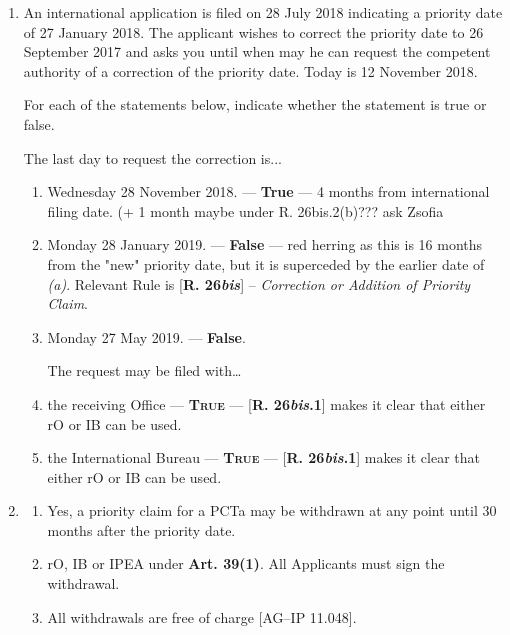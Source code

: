 \documentclass{report}
\begin{document}
\begin{enumerate}[label=\textbf{Answer \arabic*}]
\begin{enumerate}[label=(\alph*)]
    \end{enumerate}
    \item %

An international application is filed on 28 July 2018 indicating a priority date of 27 January 2018. The applicant wishes to correct the priority date to 26 September 2017 and asks you until when may he can request the competent authority of a correction of the priority date. Today is 12 November 2018.

For each of the statements below, indicate whether the statement is true or false.

The last day to request the correction is...


    \begin{enumerate}[label=(\alph*)]
        \item  Wednesday 28 November 2018. --- \textbf{True} --- 4 months from international filing date. (+ 1 month maybe under R. 26bis.2(b)??? ask Zsofia
\item Monday 28 January 2019. --- \textbf{False} --- red herring as this is 16 months from the "new" priority date, but it is superceded by the earlier date of \textit{(a)}. Relevant Rule is [\textbf{R. 26\textit{bis}}] -- \textit{Correction or Addition of Priority Claim}.
\item Monday 27 May 2019.   --- \textbf{False}.
\vspace{0.5cm}
    

The request may be filed with…
 
        \item the receiving Office --- \textbf{\textsc{True}} --- [\textbf{R. 26\textit{bis}.1}] makes it clear that either rO or IB can be used.
\item the International Bureau --- \textbf{\textsc{True}} --- [\textbf{R. 26\textit{bis}.1}] makes it clear that either rO or IB can be used.



    \end{enumerate}

\item %

    \begin{enumerate}[label=(\alph*)]
        \item  Yes, a priority claim for a PCTa may be withdrawn at any point until 30 months after the priority date.
\item rO, IB or IPEA under \textbf{Art. 39(1)}. All Applicants must sign the withdrawal.
\item All withdrawals are free of charge [\textsc{AG--IP 11.048}].


\end{enumerate}
\end{enumerate}
\end{document}
